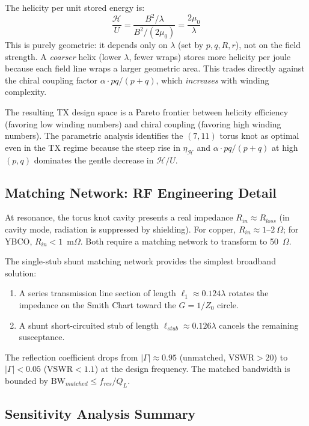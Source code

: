 The helicity per unit stored energy is:
\begin{equation}
    \frac{\mathcal{H}}{U} = \frac{B^2/\lambda}{B^2/(2\mu_0)} = \frac{2\mu_0}{\lambda}
\end{equation}
This is purely geometric: it depends only on $\lambda$ (set by $p, q, R, r$), not on the field strength. A \textit{coarser} helix (lower $\lambda$, fewer wraps) stores more helicity per joule because each field line wraps a larger geometric area. This trades directly against the chiral coupling factor $\alpha \cdot pq/(p+q)$, which \textit{increases} with winding complexity.

The resulting TX design space is a Pareto frontier between helicity efficiency (favoring low winding numbers) and chiral coupling (favoring high winding numbers). The parametric analysis identifies the $(7,11)$ torus knot as optimal even in the TX regime because the steep rise in $\eta_{\mathcal{H}}$ and $\alpha \cdot pq/(p+q)$ at high $(p,q)$ dominates the gentle decrease in $\mathcal{H}/U$.

\subsection{Matching Network: RF Engineering Detail}

At resonance, the torus knot cavity presents a real impedance $R_{in} \approx R_{loss}$ (in cavity mode, radiation is suppressed by shielding). For copper, $R_{in} \approx 1$--$2~\Omega$; for YBCO, $R_{in} < 1$~m$\Omega$. Both require a matching network to transform to 50~$\Omega$.

The single-stub shunt matching network provides the simplest broadband solution:
\begin{enumerate}
    \item A series transmission line section of length $\ell_1 \approx 0.124\lambda$ rotates the impedance on the Smith Chart toward the $G = 1/Z_0$ circle.
    \item A shunt short-circuited stub of length $\ell_{stub} \approx 0.126\lambda$ cancels the remaining susceptance.
\end{enumerate}
The reflection coefficient drops from $|\Gamma| \approx 0.95$ (unmatched, $\text{VSWR} > 20$) to $|\Gamma| < 0.05$ ($\text{VSWR} < 1.1$) at the design frequency. The matched bandwidth is bounded by $\text{BW}_{matched} \le f_{res} / Q_L$.

\subsection{Sensitivity Analysis Summary}

